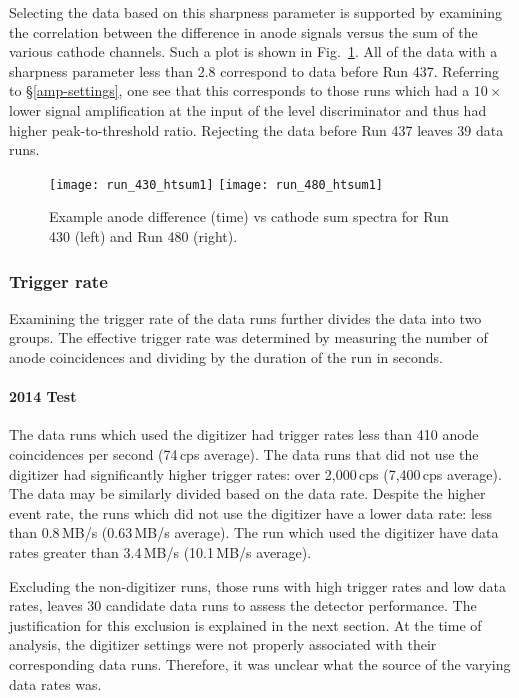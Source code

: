 Selecting the data based on this sharpness parameter is supported by examining the correlation between the difference in anode signals versus the sum of the various cathode channels. Such a plot is shown in Fig.~\ref{htsum}. All of the data with a sharpness parameter less than 2.8 correspond to data before Run 437. Referring to \S\ref{amp-settings}, one see that this corresponds to those runs which had a $10\times$ lower signal amplification at the input of the level discriminator and thus had higher peak-to-threshold ratio. Rejecting the data before Run 437 leaves 39 data runs.

\begin{figure}[ht]
\centering
\hspace{\fill}
\texttt{[image: run\_430\_htsum1]}\hspace{\fill}
\texttt{[image: run\_480\_htsum1]} \hspace{\fill}
\caption{Example anode difference (time) vs cathode sum spectra for Run 430 (left) and Run 480 (right).}
\label{htsum}
\end{figure}

\subsubsection{Trigger rate}
Examining the trigger rate of the data runs further divides the data into two groups. The effective trigger rate was determined by measuring the number of anode coincidences and dividing by the duration of the run in seconds. 
\paragraph{2014 Test}
The data runs which used the digitizer 
had trigger rates less than 410 anode coincidences per second (74\,cps average). 
The data runs that did not use the digitizer %
had significantly higher trigger rates: over 2,000\,cps (7,400\,cps average). The data may be similarly divided based on the data rate.
Despite the higher event rate, the runs which did not use the digitizer have a lower data rate: 
less than 0.8\,MB/s (0.63\,MB/s average). 
The run which used the digitizer 
have data rates greater than 3.4\,MB/s (10.1\,MB/s average). 

Excluding the non-digitizer runs, those runs with high trigger rates and low data rates, leaves 30 candidate data runs to assess the detector performance. The justification for this exclusion is explained in the next section. At the time of analysis, the  digitizer settings were not properly associated with their corresponding data runs. Therefore, it was unclear what the source of the varying data rates was.

